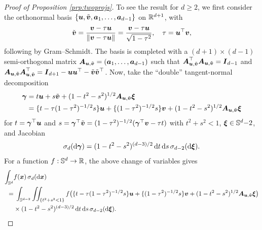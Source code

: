 \documentclass[oneside,11pt]{article}
\begin{document}
\begin{proof}[Proof of Proposition \ref{prp:twoprojs}]
To see the result for $d\geq 2$, we first consider the orthonormal basis $\{\boldsymbol{u},\tilde{\boldsymbol{v}},\boldsymbol{a}_1,\ldots,\boldsymbol{a}_{d-1}\}$ on $\mathbb{R}^{d+1}$, with
\begin{align*}
    \tilde{\boldsymbol{v}}=\frac{\boldsymbol{v}-\tau\boldsymbol{u}}{\|\boldsymbol{v}-\tau\boldsymbol{u}\|}=\frac{\boldsymbol{v}-\tau\boldsymbol{u}}{\sqrt{1-\tau^2}},\quad \tau=\boldsymbol{u}^\top\boldsymbol{v},
\end{align*}
following by Gram--Schmidt. The basis is completed with a $(d+1)\times (d-1)$ semi-orthogonal matrix $\boldsymbol{A}_{\boldsymbol{u},\tilde{\boldsymbol{v}}}=(\boldsymbol{a}_1,\ldots,\boldsymbol{a}_{d-1})$ such that $\boldsymbol{A}_{\boldsymbol{u},\tilde{\boldsymbol{v}}}^\top\boldsymbol{A}_{\boldsymbol{u},\tilde{\boldsymbol{v}}}=\boldsymbol{I}_{d-1}$ and $\boldsymbol{A}_{\boldsymbol{u},\tilde{\boldsymbol{v}}}\boldsymbol{A}_{\boldsymbol{u},\tilde{\boldsymbol{v}}}^\top=\boldsymbol{I}_{d+1}-\boldsymbol{u}\boldsymbol{u}^\top-\tilde{\boldsymbol{v}}\tilde{\boldsymbol{v}}^\top$. Now, take the ``double'' tangent-normal decomposition
\begin{align*}
    \boldsymbol\gamma&=t\boldsymbol{u}+s\tilde{\boldsymbol{v}}+(1-t^2-s^2)^{1/2}\boldsymbol{A}_{\boldsymbol{u},\tilde{\boldsymbol{v}}}\boldsymbol\xi\\
    &=\{t-\tau(1-\tau^2)^{-1/2}s\}\boldsymbol{u}+\{(1-\tau^2)^{-1/2}s\}\boldsymbol{v}+(1-t^2-s^2)^{1/2}\boldsymbol{A}_{\boldsymbol{u},\tilde{\boldsymbol{v}}}\boldsymbol\xi
\end{align*}
for $t=\boldsymbol\gamma^\top \boldsymbol{u}$ and $s=\boldsymbol\gamma^\top \tilde{\boldsymbol{v}}=(1-\tau^2)^{-1/2}(\boldsymbol\gamma^\top \boldsymbol{v}-\tau t)$ with $t^2+s^2<1$, $\boldsymbol\xi\in\mathbb{S}^d{-2}$, and Jacobian
\begin{align*}
    \sigma_d(\mathrm{d}\boldsymbol\gamma)=(1-t^2-s^2)^{(d-3)/2}\,\mathrm{d} t\,\mathrm{d} s\,\sigma_{d-2}(\mathrm{d}\boldsymbol\xi).
\end{align*}
For a function $f:\mathbb{S}^{d}\to\mathbb{R}$, the above change of variables gives
\begin{align}
    \int_{\mathbb{S}^{d}}&f(\boldsymbol{x})\,\sigma_d(\mathrm{d} \boldsymbol{x})\nonumber\\
    =&\;\int_{\mathbb{S}^{d-2}}\iint_{\{t^2+s^2<1\}} f\big(\{t-\tau(1-\tau^2)^{-1/2}s\}\boldsymbol{u}+\{(1-\tau^2)^{-1/2}s\}\boldsymbol{v}+(1-t^2-s^2)^{1/2}\boldsymbol{A}_{\boldsymbol{u},\tilde{\boldsymbol{v}}}\boldsymbol\xi\big)\nonumber\\
    &\times (1-t^2-s^2)^{(d-3)/2}\,\mathrm{d} t\,\mathrm{d} s\,\sigma_{d-2}(\mathrm{d}\boldsymbol\xi).\label{eq:tnd1}
\end{align}


\end{proof}
\end{document}
